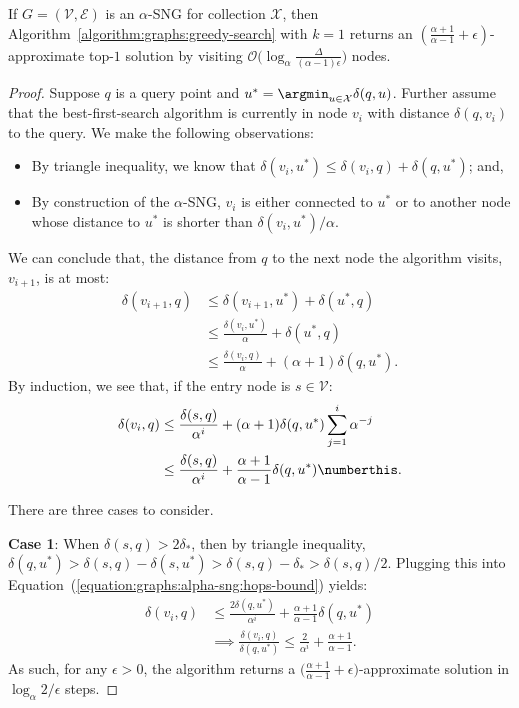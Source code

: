 \begin{theorem}
    If $G = (\mathcal{V}, \mathcal{E})$ is an $\alpha$-SNG for collection $\mathcal{X}$,
    then Algorithm~\ref{algorithm:graphs:greedy-search} with $k = 1$ returns
    an $(\frac{\alpha + 1}{\alpha - 1} + \epsilon)$-approximate top-$1$ solution
    by visiting $\mathcal{O}\big( \log_\alpha \frac{\Delta}{(\alpha - 1)\epsilon} \big)$ nodes.
\end{theorem}
\begin{proof}
    Suppose $q$ is a query point and $u^\ast = \argmin_{u \in \mathcal{X}} \delta(q, u)$.
    Further assume that the best-first-search algorithm is currently in node $v_i$
    with distance $\delta(q, v_i)$ to the query. We make the following observations:
    \begin{itemize}
        \item By triangle inequality, we know that
        $\delta(v_i, u^\ast) \leq \delta(v_i, q) + \delta(q, u^\ast)$; and,
        \item By construction of the $\alpha$-SNG, $v_i$ is either connected to $u^\ast$
        or to another node whose distance to $u^\ast$ is shorter than $\delta(v_i, u^\ast) / \alpha$.
    \end{itemize}
    We can conclude that, the distance from $q$ to the next node the algorithm
    visits, $v_{i + 1}$, is at most:
    \begin{align*}
        \delta(v_{i+1}, q) &\leq \delta(v_{i + 1}, u^\ast) + \delta(u^\ast, q) \\
        &\leq \frac{\delta(v_i, u^\ast)}{\alpha} + \delta(u^\ast, q) \\
        &\leq \frac{\delta(v_i, q)}{\alpha} + (\alpha + 1) \delta(q, u^\ast).
    \end{align*}
    By induction, we see that, if the entry node is $s \in \mathcal{V}$:
    \begin{align*}
        \delta(v_i, q) &\leq \frac{\delta(s, q)}{\alpha^i} + (\alpha + 1) \delta(q, u^\ast) \sum_{j=1}^i \alpha^{-j} \\
        &\leq \frac{\delta(s, q)}{\alpha^i} + \frac{\alpha + 1}{\alpha - 1} \delta(q, u^\ast)
        \numberthis \label{equation:graphs:alpha-sng:hops-bound}.
    \end{align*}

    There are three cases to consider.

    \textbf{Case 1}: When $\delta(s, q) > 2 \delta_\ast$, then by triangle inequality,
    $\delta(q, u^\ast) > \delta(s, q) - \delta(s, u^\ast) > \delta(s, q) - \delta_\ast > \delta(s, q) / 2$.
    Plugging this into Equation~(\ref{equation:graphs:alpha-sng:hops-bound}) yields:
    \begin{align*}
        \delta(v_i, q) &\leq \frac{2\delta(q, u^\ast)}{\alpha^i} + \frac{\alpha + 1}{\alpha - 1} \delta(q, u^\ast) \\
        &\implies \frac{\delta(v_i, q)}{\delta(q, u^\ast)} \leq \frac{2}{\alpha^i} + \frac{\alpha + 1}{\alpha - 1}.
    \end{align*}
    As such, for any $\epsilon > 0$, the algorithm returns a $\big( \frac{\alpha + 1}{\alpha - 1} + \epsilon\big)$-approximate solution in $\log_\alpha 2/\epsilon$ steps.


\end{proof}
